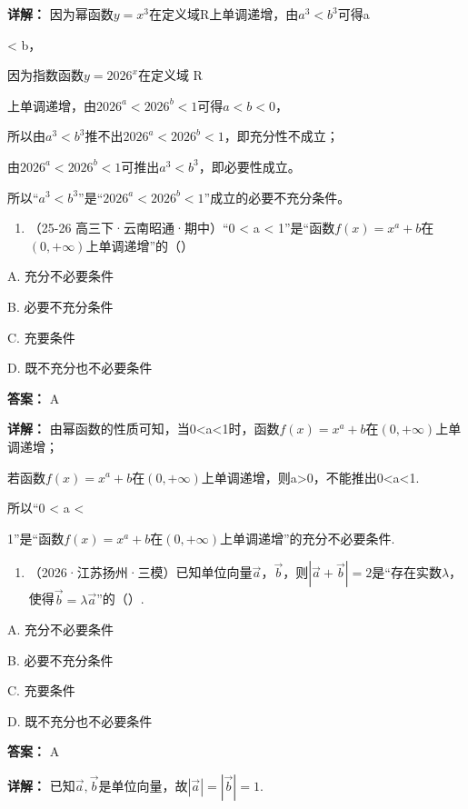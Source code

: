 \documentclass[11pt,a4paper]{ctexart}
\begin{document}
\textbf{详解：}
因为幂函数\(y = x^{3}\)在定义域R上单调递增，由\(a^{3} < b^{3}\)可得a

\textless{} b，

因为指数函数\(y = 2026^{x}\)在定义域 R

上单调递增，由\(2026^{a} < 2026^{b} < 1\)可得\(a < b < 0\)，

所以由\(a^3 < b^3\)推不出\(2026^a < 2026^b < 1\)，即充分性不成立；

由\(2026^a < 2026^b < 1\)可推出\(a^3 < b^3\)，即必要性成立。

所以``\(a^3 < b^3\)''是``\(2026^a < 2026^b < 1\)''成立的必要不充分条件。

\begin{enumerate}[label=\arabic*., leftmargin=*, start=3]
\item （25-26 高三下·云南昭通·期中）``0 \textless{} a \textless{}
  1''是``函数\(f(x) = x^{a} + b\)在\((0, +\infty)\)上单调递增''的（）
\end{enumerate}

A. 充分不必要条件

B. 必要不充分条件

C. 充要条件

D. 既不充分也不必要条件

\textbf{答案：}
A

\textbf{详解：}
由幂函数的性质可知，当0\textless a\textless1时，函数\(f(x)=x^{a}+b\)在\((0,+\infty)\)上单调递增；

若函数\(f(x)=x^{a}+b\)在\((0,+\infty)\)上单调递增，则a\textgreater0，不能推出0\textless a\textless1.

所以``0 \textless{} a \textless{}

1''是``函数\(f(x) = x^{a} + b\)在\((0, +\infty)\)上单调递增''的充分不必要条件.

\begin{enumerate}[label=\arabic*., leftmargin=*, start=4]
\item （2026·江苏扬州·三模）已知单位向量\(\vec{a}\)，\(\vec{b}\)，则\(\left|\vec{a}+\vec{b}\right|=2\)是``存在实数\(\lambda\)，使得\(\vec{b}=\lambda\vec{a}\)''的（）.
\end{enumerate}

A. 充分不必要条件

B. 必要不充分条件

C. 充要条件

D. 既不充分也不必要条件

\textbf{答案：}
A

\textbf{详解：}
已知\(\vec{a},\vec{b}\)是单位向量，故\(|\vec{a}|=|\vec{b}|=1\).
\end{document}
